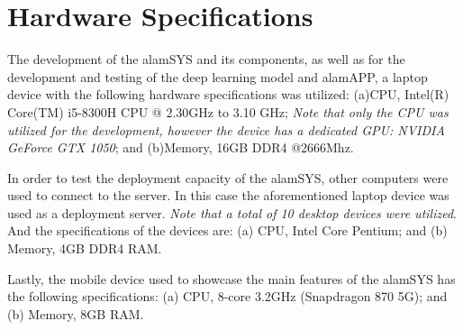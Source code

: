 \section{Hardware Specifications}
\label{sec:hardware}
The development of the alamSYS and its components, as well as for the development
and testing of the deep learning model and alamAPP, a laptop device with the
following hardware specifications was utilized: 
(a)CPU, Intel(R) Core(TM) i5-8300H CPU @ 2.30GHz to 3.10 GHz;
\textit{Note that only the CPU was utilized for the development, however the
device has a dedicated GPU: NVIDIA GeForce GTX 1050}; and 
(b)Memory, 16GB DDR4 @2666Mhz.

In order to test the deployment capacity of the alamSYS, other computers were
used to connect to the server. In this case the aforementioned laptop device
was used as a deployment server. \textit{Note that a total
of 10 desktop devices were utilized}. And the specifications of the devices are:
(a) CPU, Intel Core Pentium; and 
(b) Memory, 4GB DDR4 RAM.

Lastly, the mobile device used to showcase the main features of the
alamSYS has the following specifications:
(a) CPU, 8-core 3.2GHz (Snapdragon 870 5G); and 
(b) Memory, 8GB RAM.
